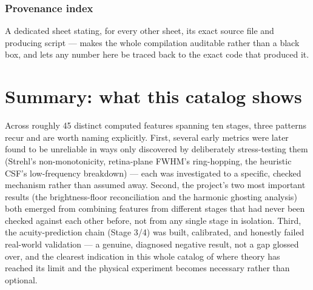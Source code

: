 \documentclass[10pt]{report}
\newcommand{\feat}[1]{\subsection*{#1}}
\begin{document}
\feat{Provenance index}
A dedicated sheet stating, for every other sheet, its exact source file and producing script --- makes the whole compilation auditable rather than a black box, and lets any number here be traced back to the exact code that produced it.

\chapter{Summary: what this catalog shows}
Across roughly 45 distinct computed features spanning ten stages, three patterns recur and are worth naming explicitly. First, several early metrics were later found to be unreliable in ways only discovered by deliberately stress-testing them (Strehl's non-monotonicity, retina-plane FWHM's ring-hopping, the heuristic CSF's low-frequency breakdown) --- each was investigated to a specific, checked mechanism rather than assumed away. Second, the project's two most important results (the brightness-floor reconciliation and the harmonic ghosting analysis) both emerged from combining features from different stages that had never been checked against each other before, not from any single stage in isolation. Third, the acuity-prediction chain (Stage 3/4) was built, calibrated, and honestly failed real-world validation --- a genuine, diagnosed negative result, not a gap glossed over, and the clearest indication in this whole catalog of where theory has reached its limit and the physical experiment becomes necessary rather than optional.
\end{document}
